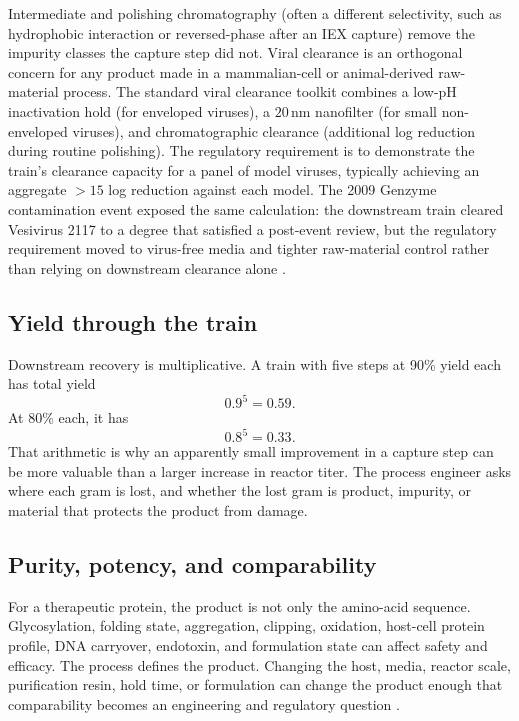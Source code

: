 Intermediate and polishing chromatography (often a different
selectivity, such as hydrophobic interaction or reversed-phase after
an IEX capture) remove the impurity classes the capture step did not.
Viral clearance is an orthogonal concern for any product made in a
mammalian-cell or animal-derived raw-material process. The standard
viral clearance toolkit combines a low-pH inactivation hold (for
enveloped viruses), a $20\,\text{nm}$ nanofilter (for small non-
enveloped viruses), and chromatographic clearance (additional log
reduction during routine polishing). The regulatory requirement is to
demonstrate the train's clearance capacity for a panel of model
viruses, typically achieving an aggregate $>15$ log reduction against
each model. The 2009 Genzyme contamination event exposed the same
calculation: the downstream train cleared Vesivirus 2117 to a degree
that satisfied a post-event review, but the regulatory requirement
moved to virus-free media and tighter raw-material control rather
than relying on downstream clearance alone
\cite{web:v6c10-fda-warning-letter-genzyme-2010}.

\subsection{Yield through the train}

Downstream recovery is multiplicative. A train with five steps at 90\%
yield each has total yield
\[
0.9^5 = 0.59.
\]
At 80\% each, it has
\[
0.8^5 = 0.33.
\]
That arithmetic is why an apparently small improvement in a capture
step can be more valuable than a larger increase in reactor titer. The
process engineer asks where each gram is lost, and whether the lost gram
is product, impurity, or material that protects the product from damage.

\subsection{Purity, potency, and comparability}

For a therapeutic protein, the product is not only the amino-acid
sequence. Glycosylation, folding state, aggregation, clipping, oxidation,
host-cell protein profile, DNA carryover, endotoxin, and formulation
state can affect safety and efficacy. The process defines the product.
Changing the host, media, reactor scale, purification resin, hold time,
or formulation can change the product enough that comparability becomes
an engineering and regulatory question
\cite{paper:v6c10-jagschies-biopharma-economics-2018}.


